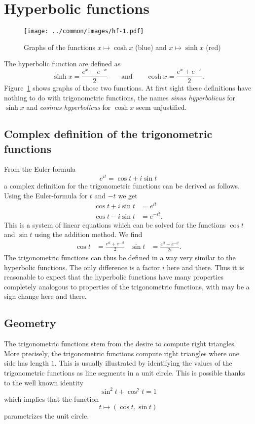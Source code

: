 %
%
%
\section{Hyperbolic functions}
\begin{figure}
\centering
\texttt{[image: ../common/images/hf-1.pdf]}
\caption{Graphs of the functions 
$x\mapsto\cosh x$ (blue)
and $x\mapsto\sinh x$ (red)
\label{hyp:graphen}}
\end{figure}
The hyperbolic function are defined as
\[
\sinh x =\frac{e^x-e^{-x}}2
\qquad\text{and}\qquad
\cosh x = \frac{e^x+e^{-x}}2.
\]
Figure~\ref{hyp:graphen} shows graphs of those two functions.
At first sight these definitions have nothing to do with trigonometric
functions, the names {\em sinus hyperbolicus} for $\sinh x$ and
{\em cosinus hyperbolicus} for $\cosh x$ seem unjustified.

\subsection{Complex definition of the trigonometric functions}
From the Euler-formula
\[
e^{it}=\cos t+i\sin t
\]
a complex definition for the trigonometric functions can be derived
as follows.
Using the Euler-formula for $t$ and $-t$ we get
\begin{align*}
\cos t+i\sin t&=e^{it}\\
\cos t-i\sin t&=e^{-it}.
\end{align*}
This is a system of linear equations which can be solved
for the functions $\cos t$ and $\sin t$ using the addition method.
We find
\begin{align*}
\cos t
&=
\frac{e^{it}+e^{-it}}2
&
\sin t
&=
\frac{e^{it}-e^{-it}}{2i}.
\end{align*}
The trigonometric functions can thus be defined in a way very similar
to the hyperbolic functions.
The only difference is a factor $i$ here and there.
Thus it is reasonable to expect that the hyperbolic functions
have many properties completely analogous to properties of the
trigonometric functions, with may be a sign change here and there.

\subsection{Geometry}
The trigonometric functions stem from the desire to compute right
triangles.
More precisely, the trigonometric functions compute right triangles
where one side has length $1$.
This is usually illustrated by identifying the values of the
trigonometric functions as line segments in a unit circle.
This is possible thanks to the well known identity
\[
\sin^2t+\cos^2t=1
\]
which implies that the function
\[
t\mapsto (\cos t,\sin t)
\]
parametrizes the unit circle.

